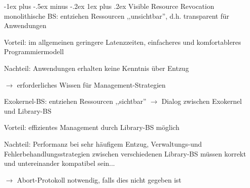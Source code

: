 \documentclass[a4paper]{article}
\makeatletter
\renewcommand{\subsubsection}{\@startsection{subsubsection}{3}{0mm}%
 {-1ex plus -.5ex minus -.2ex}%
 {1ex plus .2ex}%
 {\normalfont\small\bfseries}}
\makeatother
\begin{document}
\begin{multicols}{3}
    \subsubsection{Visible Resource Revocation}
    monolithische BS: entziehen Ressourcen ,,unsichtbar'', d.h. transparent für Anwendungen
    \begin{itemize*}
        \item Vorteil: im allgemeinen geringere Latenzzeiten, einfacheres und komfortableres Programmiermodell
        \item Nachteil: Anwendungen erhalten keine Kenntnis über Entzug
        \item[$\rightarrow$] erforderliches Wissen für Management-Strategien
    \end{itemize*}
    Exokernel-BS: entziehen Ressourcen ,,sichtbar'' $\rightarrow$ Dialog zwischen Exokernel und Library-BS
    \begin{itemize*}
        \item Vorteil: effizientes Management durch Library-BS möglich %
        \item Nachteil: Performanz bei sehr häufigem Entzug, Verwaltungs-und Fehlerbehandlungsstrategien zwischen verschiedenen Library-BS müssen korrekt und untereinander kompatibel sein...
        \item[$\rightarrow$] Abort-Protokoll notwendig, falls dies nicht gegeben ist
    \end{itemize*}


\end{multicols}
\end{document}
